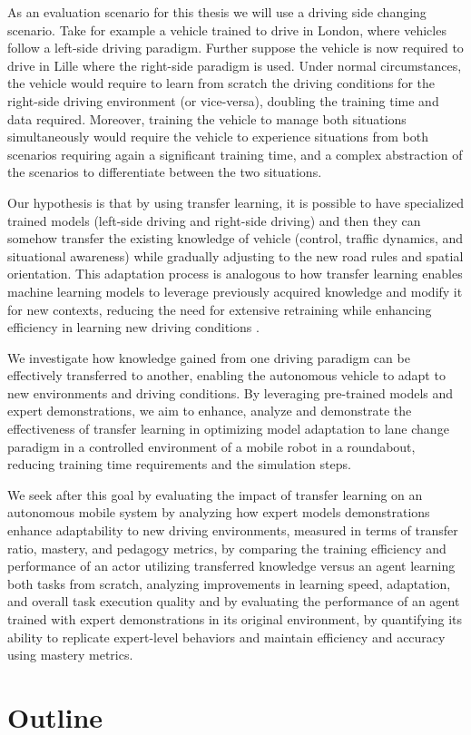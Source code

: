 As an evaluation scenario for this thesis we will use a driving side changing scenario. Take for example a vehicle trained to drive in London, where vehicles follow a left-side driving paradigm. Further suppose the vehicle is now required to drive in Lille where the right-side paradigm is used. Under normal circumstances, the vehicle would require to learn from scratch the driving conditions for the right-side driving environment (or vice-versa), doubling the training time and data required. Moreover, training the vehicle to manage both situations simultaneously would require the vehicle to experience situations from both scenarios requiring again a significant training time, and a complex abstraction of the scenarios to differentiate between the two situations. 

Our hypothesis is that by using transfer learning, it is possible to have specialized trained models (\eg left-side driving and right-side driving) and then they can somehow transfer the existing knowledge of vehicle (control, traffic dynamics, and situational awareness) while gradually adjusting to the new road rules and spatial orientation. This adaptation process is analogous to how transfer learning enables machine learning models to leverage previously acquired knowledge and modify it for new contexts, reducing the need for extensive retraining while enhancing efficiency in learning new driving conditions \cite{transfer_learning_driving_paradigm_change}.

We investigate how knowledge gained from one driving paradigm can be effectively transferred to another, enabling the autonomous vehicle to adapt to new environments and driving conditions. By leveraging pre-trained models and expert demonstrations, we aim to enhance, analyze and demonstrate the effectiveness of transfer learning in optimizing model adaptation to lane change paradigm in a controlled environment of a mobile robot in a roundabout, reducing training time requirements and the simulation steps.

We seek after this goal by evaluating the impact of transfer learning on an autonomous mobile system by analyzing how expert models demonstrations enhance adaptability to new driving environments, measured in terms of transfer ratio, mastery, and pedagogy metrics, by comparing the training efficiency and performance of an actor utilizing transferred knowledge versus an agent learning both tasks from scratch, analyzing improvements in learning speed, adaptation, and overall task execution quality and by evaluating the performance of an agent trained with expert demonstrations in its original environment, by quantifying its ability to replicate expert-level behaviors and maintain efficiency and accuracy using mastery metrics. 

\section{Outline}


\endinput

